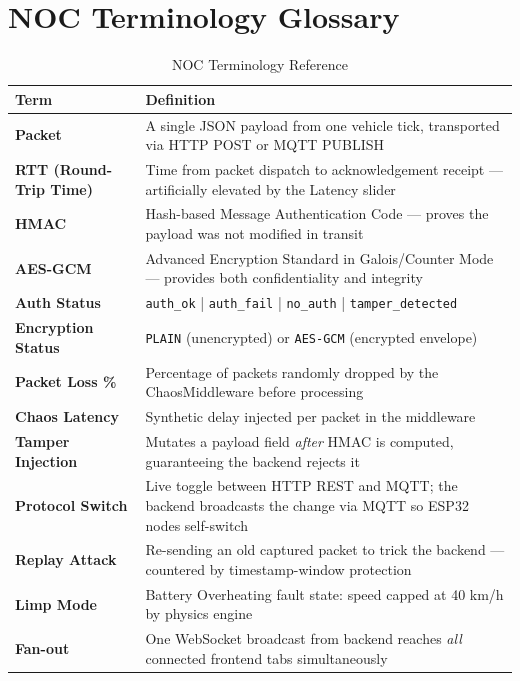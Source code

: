 \documentclass[12pt,a4paper]{report}
\begin{document}
\section{NOC Terminology Glossary}

\begin{table}[H]
\centering
\caption{NOC Terminology Reference}
\label{tab:terminology}
\begin{tabularx}{\textwidth}{L{4cm} X}
\toprule
\textbf{Term} & \textbf{Definition} \\
\midrule
\textbf{Packet} & A single JSON payload from one vehicle tick, transported via HTTP POST or MQTT PUBLISH \\
\textbf{RTT (Round-Trip Time)} & Time from packet dispatch to acknowledgement receipt — artificially elevated by the Latency slider \\
\textbf{HMAC} & Hash-based Message Authentication Code — proves the payload was not modified in transit \\
\textbf{AES-GCM} & Advanced Encryption Standard in Galois/Counter Mode — provides both confidentiality and integrity \\
\textbf{Auth Status} & \texttt{auth\_ok} | \texttt{auth\_fail} | \texttt{no\_auth} | \texttt{tamper\_detected} \\
\textbf{Encryption Status} & \texttt{PLAIN} (unencrypted) or \texttt{AES-GCM} (encrypted envelope) \\
\textbf{Packet Loss \%} & Percentage of packets randomly dropped by the ChaosMiddleware before processing \\
\textbf{Chaos Latency} & Synthetic delay injected per packet in the middleware \\
\textbf{Tamper Injection} & Mutates a payload field \textit{after} HMAC is computed, guaranteeing the backend rejects it \\
\textbf{Protocol Switch} & Live toggle between HTTP REST and MQTT; the backend broadcasts the change via MQTT so ESP32 nodes self-switch \\
\textbf{Replay Attack} & Re-sending an old captured packet to trick the backend — countered by timestamp-window protection \\
\textbf{Limp Mode} & Battery Overheating fault state: speed capped at 40 km/h by physics engine \\
\textbf{Fan-out} & One WebSocket broadcast from backend reaches \textit{all} connected frontend tabs simultaneously \\
\bottomrule
\end{tabularx}
\end{table}
\end{document}

